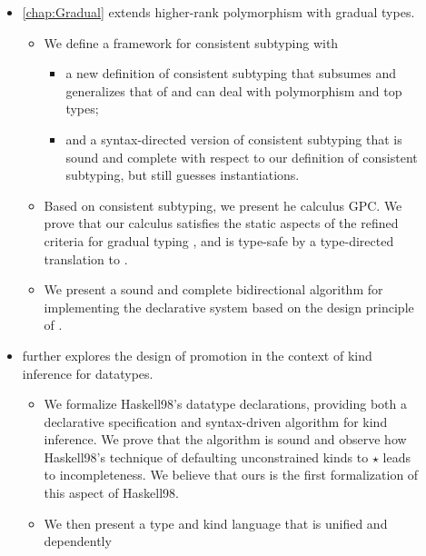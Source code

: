 \begin{description}
\item[]
  \begin{itemize}

  \item \cref{chap:Gradual} extends higher-rank
    polymorphism with gradual types.
    \begin{itemize}
    \item We define a framework for consistent subtyping with
      \begin{itemize}
      \item a new definition of
        consistent subtyping that subsumes and generalizes that of
        \cite{siek:consistent:subtyping} and can deal with polymorphism and top
        types;
      \item and a syntax-directed version of consistent subtyping that is sound
        and complete with respect to our definition of consistent subtyping, but
        still guesses instantiations.
      \end{itemize}
    \item Based on consistent subtyping, we present he calculus GPC. We prove that
      our calculus satisfies the static aspects of the refined criteria for
      gradual typing \citep{siek:criteria}, and is type-safe by a type-directed
      translation to \pbc \citep{amal:blame}.
    \item We present a sound and complete
      bidirectional algorithm for implementing the declarative system based on
      the design principle of \cite{garcia:principal}.
    \end{itemize}
  \item {} further explores the design of promotion in the context of kind
    inference for datatypes.
    \begin{itemize}
    \item We formalize Haskell98’s datatype declarations, providing both a
      declarative specification and syntax-driven algorithm for kind inference. We
      prove that the algorithm is sound and observe how Haskell98’s technique of
      defaulting unconstrained kinds to $\star$ leads to incompleteness. We
      believe that ours is the first formalization of this aspect of Haskell98.
    \item We then present a type and kind language that is unified and dependently

\end{itemize}
\end{itemize}
\end{description}
